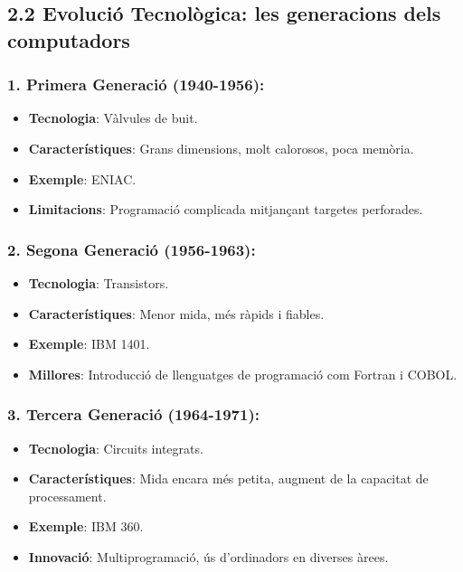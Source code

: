 \documentclass[
  12 pt,
  a4paper,
]{article}
\providecommand{\tightlist}{%
  \setlength{\itemsep}{0pt}\setlength{\parskip}{0pt}}
\begin{document}
\subsection{2.2 Evolució Tecnològica: les generacions dels
computadors}\label{evoluciuxf3-tecnoluxf2gica-les-generacions-dels-computadors}

\subsubsection{1. Primera Generació
(1940-1956):}\label{primera-generaciuxf3-1940-1956}

\begin{itemize}
\tightlist
\item
  \textbf{Tecnologia}: Vàlvules de buit.
\item
  \textbf{Característiques}: Grans dimensions, molt calorosos, poca
  memòria.
\item
  \textbf{Exemple}: ENIAC.
\item
  \textbf{Limitacions}: Programació complicada mitjançant targetes
  perforades.
\end{itemize}

\subsubsection{2. Segona Generació
(1956-1963):}\label{segona-generaciuxf3-1956-1963}

\begin{itemize}
\tightlist
\item
  \textbf{Tecnologia}: Transistors.
\item
  \textbf{Característiques}: Menor mida, més ràpids i fiables.
\item
  \textbf{Exemple}: IBM 1401.
\item
  \textbf{Millores}: Introducció de llenguatges de programació com
  Fortran i COBOL.
\end{itemize}

\subsubsection{3. Tercera Generació
(1964-1971):}\label{tercera-generaciuxf3-1964-1971}

\begin{itemize}
\tightlist
\item
  \textbf{Tecnologia}: Circuits integrats.
\item
  \textbf{Característiques}: Mida encara més petita, augment de la
  capacitat de processament.
\item
  \textbf{Exemple}: IBM 360.
\item
  \textbf{Innovació}: Multiprogramació, ús d'ordinadors en diverses
  àrees.
\end{itemize}
\end{document}
